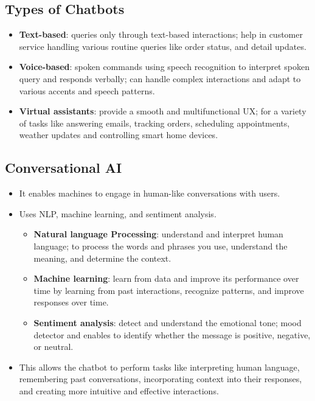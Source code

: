 \documentclass[12pt, letterpaper]{article}
\begin{document}
\subsection{Types of Chatbots}
\begin{itemize}
    \item \textbf{Text-based}: queries only through text-based interactions; help in customer service handling various routine queries like order status, and detail updates.
    \item \textbf{Voice-based}: spoken commands using speech recognition to interpret spoken query and responds verbally; can handle complex interactions and adapt to various accents and speech patterns.
    \item \textbf{Virtual assistants}: provide a smooth and multifunctional UX; for a variety of tasks like answering emails, tracking orders, scheduling appointments, weather updates and controlling smart home devices.
\end{itemize}

\subsection{Conversational AI}
\begin{itemize}
    \item It enables machines to engage in human-like conversations with users.
    \item Uses NLP, machine learning, and sentiment analysis.
        \begin{itemize}
            \item \textbf{Natural language Processing}: understand and interpret human language; to process the words and phrases you use, understand the meaning, and determine the context.
            \item \textbf{Machine learning}: learn from data and improve its performance over time by learning from past interactions, recognize patterns, and improve responses over time.
            \item \textbf{Sentiment analysis}: detect and understand the emotional tone; mood detector and enables to identify whether the message is positive, negative, or neutral.
        \end{itemize}
    \item This allows the chatbot to perform tasks like interpreting human language, remembering past conversations, incorporating context into their responses, and creating more intuitive and effective interactions.
\end{itemize}
\end{document}
